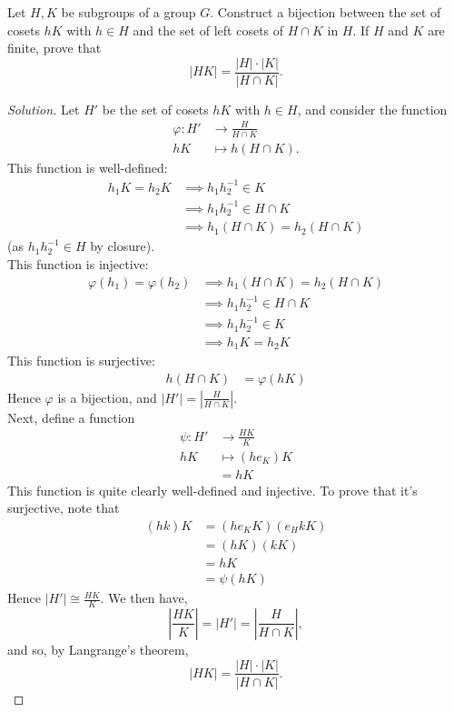 \documentclass[12pt]{article}
\newenvironment{problem}[2][Problem]{\begin{trivlist}
\item[\hskip \labelsep {\bfseries #1}\hskip \labelsep {\bfseries #2.}]}{\end{trivlist}}
\newenvironment{solution}
  {\renewcommand\qedsymbol{$\blacksquare$}\begin{proof}[Solution]}
{\end{proof}}
\theoremstyle{remark}
\begin{document}
\begin{problem}{8.21}
  Let $H,K$ be subgroups of a group $G$.
  Construct a bijection between the set of cosets $hK$ with $h\in H$ and the set of left cosets of 
  $H\cap K$ in $H$.
  If $H$ and $K$ are finite, prove that
  \begin{equation*}
    |HK| = \frac{|H|\cdot|K|}{|H\cap K|}.
  \end{equation*}
\end{problem}
\begin{solution}
  Let $H'$ be the set of cosets $hK$ with $h\in H$, and consider the function 
  \begin{align*}
    \varphi:H' &\to \frac{H}{H\cap K} \\
    hK &\mapsto h(H\cap K).
  \end{align*}
  This function is well-defined:
  \begin{align*}
    h_1K=h_2K &\implies h_1h_2^{-1}\in K \\
    &\implies h_1h_2^{-1}\in H\cap K \\
    &\implies h_1(H\cap K) = h_2(H\cap K)
  \end{align*}
  (as $h_1h_2^{-1}\in H$ by closure).\\
  This function is injective:
  \begin{align*}
    \varphi(h_1)=\varphi(h_2) &\implies h_1(H\cap K) = h_2(H\cap K)\\
    &\implies h_1h_2^{-1}\in H\cap K\\
    &\implies h_1h_2^{-1}\in K \\
    &\implies h_1K = h_2K
  \end{align*}
  This function is surjective:
  \begin{align*}
    h(H\cap K) &= \varphi(hK)
  \end{align*}
  Hence $\varphi$ is a bijection, and $|H'| = \left|\frac{H}{H\cap K}\right|$.\\
  Next, define a function
  \begin{align*}
    \psi:H'&\to\frac{HK}{K}\\
    hK&\mapsto (he_K)K\\
    &= hK
  \end{align*}
  This function is quite clearly well-defined and injective.
  To prove that it's surjective, note that
  \begin{align*}
    (hk)K &= (he_KK)(e_HkK) \\
    &= (hK)(kK)\\
    &= hK\\
    &= \psi(hK)
  \end{align*}
  Hence $|H'| \cong \frac{HK}{K}$.
  We then have,
  \begin{equation*}
    \left|\frac{HK}{K}\right| = |H'| = \left|\frac{H}{H\cap K}\right|, 
  \end{equation*}
  and so, by Langrange's theorem,
  \begin{equation*}
    |HK|=\frac{|H|\cdot |K|}{|H\cap K|}.
  \end{equation*}
\end{solution}
\end{document}
